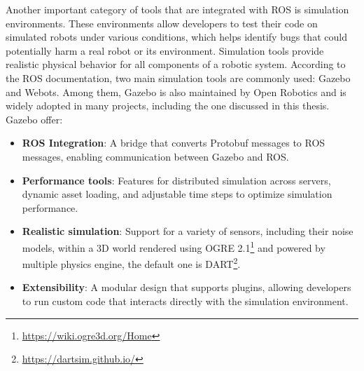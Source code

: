 Another important category of tools that are integrated with ROS is simulation environments. These environments allow developers to test their code on simulated robots under various conditions, which helps identify bugs that could potentially harm a real robot or its environment. Simulation tools provide realistic physical behavior for all components of a robotic system.
According to the ROS documentation, two main simulation tools are commonly used: Gazebo and Webots. Among them, Gazebo is also maintained by Open Robotics and is widely adopted in many projects, including the one discussed in this thesis.\\
Gazebo offer:
\begin{itemize}
	\item \textbf{ROS Integration}: A bridge that converts Protobuf messages to ROS messages, enabling communication between Gazebo and ROS.
	\item \textbf{Performance tools}: Features for distributed simulation across servers, dynamic asset loading, and adjustable time steps to optimize simulation performance.
	\item \textbf{Realistic simulation}: Support for a variety of sensors, including their noise models, within a 3D world rendered using OGRE 2.1\footnote{\href{https://wiki.ogre3d.org/Home}{https://wiki.ogre3d.org/Home}} and powered by multiple physics engine, the default one is DART\footnote{\href{https://dartsim.github.io/}{https://dartsim.github.io/}}.
	\item \textbf{Extensibility}: A modular design that supports plugins, allowing developers to run custom code that interacts directly with the simulation environment.	
\end{itemize}
